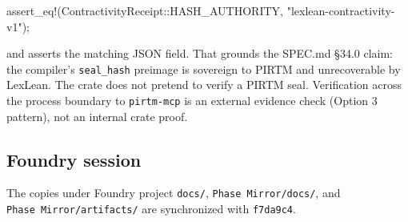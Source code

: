 \documentclass[
]{article}
\newenvironment{Shaded}{}{}
\newcommand{\NormalTok}[1]{#1}
\newcommand{\OperatorTok}[1]{\textcolor[rgb]{0.40,0.40,0.40}{#1}}
\newcommand{\PreprocessorTok}[1]{\textcolor[rgb]{0.74,0.48,0.00}{#1}}
\newcommand{\StringTok}[1]{\textcolor[rgb]{0.25,0.44,0.63}{#1}}
\begin{document}
\begin{Shaded}
\begin{Highlighting}[]
\PreprocessorTok{assert\_eq!}\NormalTok{(}\PreprocessorTok{ContractivityReceipt::}\NormalTok{HASH\_AUTHORITY}\OperatorTok{,} \StringTok{"lexlean{-}contractivity{-}v1"}\NormalTok{)}\OperatorTok{;}
\end{Highlighting}
\end{Shaded}

and asserts the matching JSON field. That grounds the SPEC.md §34.0
claim: the compiler's \texttt{seal\_hash} preimage is sovereign to PIRTM
and unrecoverable by LexLean. The crate does not pretend to verify a
PIRTM seal. Verification across the process boundary to
\texttt{pirtm-mcp} is an external evidence check (Option 3 pattern), not
an internal crate proof.

\hypertarget{foundry-session}{%
\subsection{Foundry session}\label{foundry-session}}

The copies under Foundry project \texttt{docs/},
\texttt{Phase\ Mirror/docs/}, and \texttt{Phase\ Mirror/artifacts/} are
synchronized with \texttt{f7da9c4}.
\end{document}
